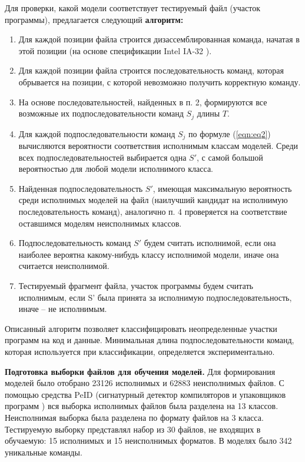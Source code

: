 \documentclass{book}
\begin{document}
Для проверки, какой модели соответствует тестируемый файл (участок программы),
предлагается следующий \textbf{алгоритм:}

\begin{enumerate}[topsep=0pt, listparindent =0cm, itemindent=1.7cm, leftmargin=0cm]
	\setlength{\itemsep}{-5px}
	\item Для каждой позиции файла строится дизассемблированная команда, начатая в этой позиции (на основе спецификации Intel IA-32 \cite{Assembly}).
	\item Для каждой позиции файла строится последовательность команд, которая обрывается на позиции, с которой невозможно получить корректную команду.
	\item На основе последовательностей, найденных в п. 2, формируются все возможные их подпоследовательности команд $S_{j}$ длины $T$.
	\item Для каждой подпоследовательности команд $S_{j}$ по формуле (\ref{eqn:eq2}) вычисляются вероятности соответствия исполнимым классам моделей. 
	Среди всех подпоследовательностей выбирается одна $S'$, с самой большой вероятностью для любой модели исполнимого класса.
	\item Найденная подпоследовательность $S'$, имеющая максимальную вероятность среди исполнимых моделей на файл (наилучший 
	кандидат на исполнимую последовательность 	команд), аналогично п. 4 проверяется на соответствие оставшимся моделям неисполнимых классов.
	\item Подпоследовательность команд $S'$ будем считать исполнимой, если она наиболее вероятна какому-нибудь классу 
	исполнимой модели, иначе она считается неисполнимой.
	\item Тестируемый фрагмент файла, участок программы будем считать исполнимым,
	если S' была принята за исполнимую подпоследовательность, иначе – не исполнимым.
\end{enumerate}


Описанный алгоритм позволяет классифицировать неопределенные участки программ на код и данные. 
Минимальная длина подпоследовательности команд, которая
используется при классификации, определяется экспериментально.

\textbf{Подготовка выборки файлов для обучения моделей.} Для формирования моделей было отобрано 23126 
исполнимых и 62883 неисполнимых файлов. С помощью средства PeID (сигнатурный детектор компиляторов и упаковщиков программ \cite{PeID}
) 
вся выборка исполнимых файлов была разделена на 13 классов. Неисполнимая выборка была разделена по формату файлов на 3 класса. 
Тестируемую выборку представлял набор из 30 файлов, не входящих в обучаемую: 15 исполнимых и 15 неисполнимых форматов. 
В моделях было 342 уникальные команды.
\end{document}
